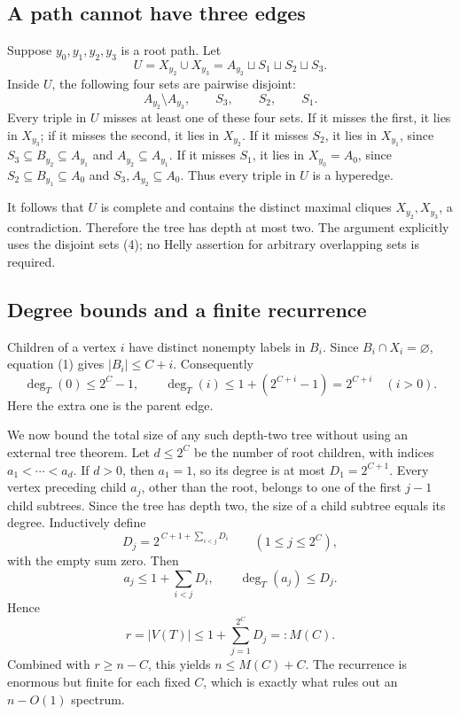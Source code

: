 \subsection*{A path cannot have three edges}
Suppose \(y_0,y_1,y_2,y_3\) is a root path. Let
\[
U=X_{y_2}\cup X_{y_3}=A_{y_2}\sqcup S_1\sqcup S_2\sqcup S_3.
\]
Inside \(U\), the following four sets are pairwise disjoint:
\[
A_{y_2}\setminus A_{y_3},\qquad S_3,\qquad S_2,\qquad S_1. \tag{4}
\]
Every triple in \(U\) misses at least one of these four sets. If it misses the first, it lies in \(X_{y_3}\); if it misses the second, it lies in \(X_{y_2}\). If it misses \(S_2\), it lies in \(X_{y_1}\), since \(S_3\subseteq B_{y_2}\subseteq A_{y_1}\) and \(A_{y_2}\subseteq A_{y_1}\). If it misses \(S_1\), it lies in \(X_{y_0}=A_0\), since \(S_2\subseteq B_{y_1}\subseteq A_0\) and \(S_3,A_{y_2}\subseteq A_0\). Thus every triple in \(U\) is a hyperedge.

It follows that \(U\) is complete and contains the distinct maximal cliques \(X_{y_2},X_{y_3}\), a contradiction. Therefore the tree has depth at most two. The argument explicitly uses the disjoint sets (4); no Helly assertion for arbitrary overlapping sets is required.

\subsection*{Degree bounds and a finite recurrence}
Children of a vertex \(i\) have distinct nonempty labels in \(B_i\). Since \(B_i\cap X_i=\varnothing\), equation (1) gives \(|B_i|\leq C+i\). Consequently
\[
\deg_T(0)\leq2^C-1,\qquad
\deg_T(i)\leq1+(2^{C+i}-1)=2^{C+i}\quad(i>0). \tag{5}
\]
Here the extra one is the parent edge.

We now bound the total size of any such depth-two tree without using an external tree theorem. Let \(d\leq2^C\) be the number of root children, with indices \(a_1<\cdots<a_d\). If \(d>0\), then \(a_1=1\), so its degree is at most \(D_1=2^{C+1}\).
Every vertex preceding child \(a_j\), other than the root, belongs to one of the first \(j-1\) child subtrees. Since the tree has depth two, the size of a child subtree equals its degree. Inductively define
\[
D_j=2^{\,C+1+\sum_{i<j}D_i}\qquad(1\leq j\leq2^C),
\]
with the empty sum zero. Then
\[
a_j\leq1+\sum_{i<j}D_i,\qquad \deg_T(a_j)\leq D_j.
\]
Hence
\[
r=|V(T)|\leq1+\sum_{j=1}^{2^C}D_j=:M(C).
\]
Combined with \(r\geq n-C\), this yields \(n\leq M(C)+C\). The recurrence is enormous but finite for each fixed \(C\), which is exactly what rules out an \(n-O(1)\) spectrum.

